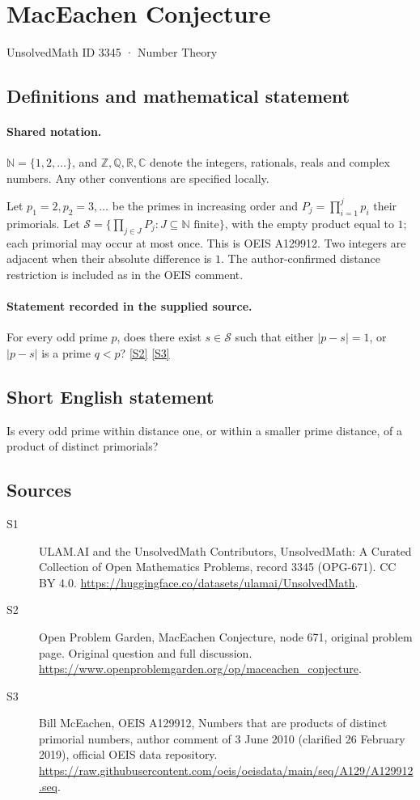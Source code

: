 \documentclass[11pt]{article}
\newcommand{\sref}[2]{\hyperlink{source:#1:#2}{[S#2]}}
\begin{document}
\setcounter{section}{3344}
\section{MacEachen Conjecture}\label{3345}
{\small\sffamily UnsolvedMath ID 3345 · Number Theory}
\subsection{Definitions and mathematical statement}

\paragraph{Shared notation.}$\mathbb N=\{1,2,\ldots\}$, and $\mathbb Z,\mathbb Q,\mathbb R,\mathbb C$ denote the integers, rationals, reals and complex numbers. Any other conventions are specified locally.


Let $p_1=2,p_2=3,\ldots$ be the primes in increasing order and $P_j=\prod_{i=1}^j p_i$ their primorials. Let $\mathcal S=\{\prod_{j\in J}P_j:J\subseteq\mathbb N\text{ finite}\}$, with the empty product equal to $1$; each primorial may occur at most once. This is OEIS A129912. Two integers are adjacent when their absolute difference is $1$. The author-confirmed distance restriction is included as in the OEIS comment.
\paragraph{Statement recorded in the supplied source.}
For every odd prime $p$, does there exist $s\in\mathcal S$ such that either $|p-s|=1$, or $|p-s|$ is a prime $q<p$? \sref{3345}{2} \sref{3345}{3}
\subsection{Short English statement}
Is every odd prime within distance one, or within a smaller prime distance, of a product of distinct primorials?
\subsection{Sources}
\begin{description}
\item[\hypertarget{source:3345:1}{S1}] ULAM.AI and the UnsolvedMath Contributors, UnsolvedMath: A Curated Collection of Open Mathematics Problems, record 3345 (OPG-671). CC BY 4.0. \url{https://huggingface.co/datasets/ulamai/UnsolvedMath}.
\item[\hypertarget{source:3345:2}{S2}] Open Problem Garden, MacEachen Conjecture, node 671, original problem page. Original question and full discussion. \url{https://www.openproblemgarden.org/op/maceachen_conjecture}.
\item[\hypertarget{source:3345:3}{S3}] Bill McEachen, OEIS A129912, Numbers that are products of distinct primorial numbers, author comment of 3 June 2010 (clarified 26 February 2019), official OEIS data repository. \url{https://raw.githubusercontent.com/oeis/oeisdata/main/seq/A129/A129912.seq}.
\end{description}
\label{end:3345}
\end{document}
